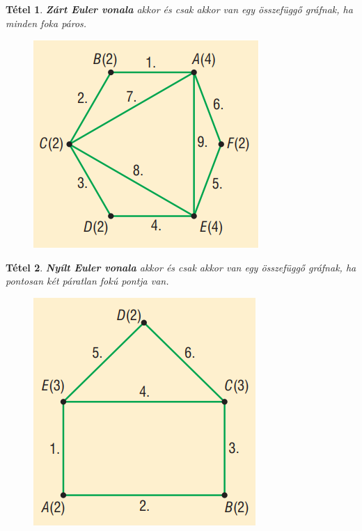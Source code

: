 \documentclass[12pt,a4paper]{article}
\newtheorem{theorem}{Tétel} [section]
\begin{document}
\begin{theorem}
\textbf{Zárt Euler vonala} akkor és csak akkor van egy összefüggő gráfnak, ha minden foka páros.
\begin{figure}[h]
\centering
\includegraphics[scale=0.3]{geometry/zart_Euler}
\end{figure}
\end{theorem}
\newpage
\begin{theorem}
\textbf{Nyílt Euler vonala} akkor és csak akkor van egy összefüggő gráfnak, ha pontosan két páratlan fokú pontja van.
\begin{figure}[h]
\centering
\includegraphics[scale=0.3]{geometry/nyilt_Euler}
\end{figure}
\end{theorem}
\end{document}
